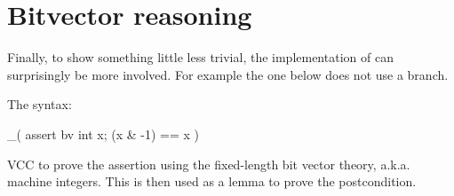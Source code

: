 \section{Bitvector reasoning}
\label{sect:bv}

Finally, 
to show something little less trivial, the implementation of  can surprisingly be more involved.
For example the one below does not use a branch.


\noindent
The syntax:
\begin{VCC}
_( assert {bv} \forall int x; (x & -1) == x )
\end{VCC}

\noindent
VCC to prove the assertion using the fixed-length bit vector theory, a.k.a. machine integers.
This is then used as a lemma to prove the postcondition.



